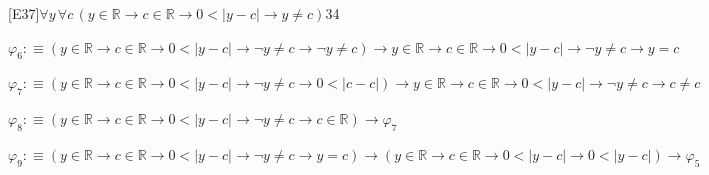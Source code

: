 \begin{fullproof}{[E37]}{$\forall y\,\forall c\,(y \in \mathbb{R} \to c \in \mathbb{R} \to 0 < \lvert y - c \rvert \to y \neq c)$}{34}
\begin{abbrevlist}
\item $\varphi_{6} :\equiv (y \in \mathbb{R} \to c \in \mathbb{R} \to 0 < \lvert y - c \rvert \to \neg y \neq c \to \neg y \neq c) \to y \in \mathbb{R} \to c \in \mathbb{R} \to 0 < \lvert y - c \rvert \to \neg y \neq c \to y = c$
\item $\varphi_{7} :\equiv (y \in \mathbb{R} \to c \in \mathbb{R} \to 0 < \lvert y - c \rvert \to \neg y \neq c \to 0 < \lvert c - c \rvert) \to y \in \mathbb{R} \to c \in \mathbb{R} \to 0 < \lvert y - c \rvert \to \neg y \neq c \to c \neq c$
\item $\varphi_{8} :\equiv (y \in \mathbb{R} \to c \in \mathbb{R} \to 0 < \lvert y - c \rvert \to \neg y \neq c \to c \in \mathbb{R}) \to \varphi_{7}$
\item $\varphi_{9} :\equiv (y \in \mathbb{R} \to c \in \mathbb{R} \to 0 < \lvert y - c \rvert \to \neg y \neq c \to y = c) \to (y \in \mathbb{R} \to c \in \mathbb{R} \to 0 < \lvert y - c \rvert \to 0 < \lvert y - c \rvert) \to \varphi_{5}$
\end{abbrevlist}
\end{fullproof}

